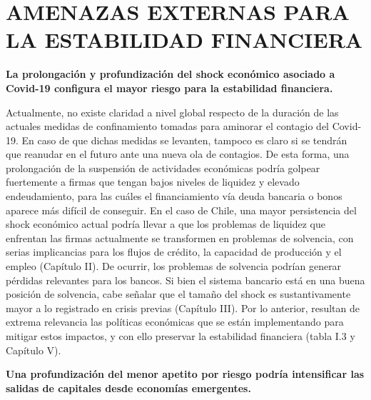 \documentclass[
]{book}
\begin{document}
\hypertarget{AEEF}{%
\section*{AMENAZAS EXTERNAS PARA LA ESTABILIDAD FINANCIERA}\label{AEEF}}

\textbf{La prolongación y profundización del shock económico asociado a Covid-19 configura el mayor riesgo para la estabilidad financiera.}

Actualmente, no existe claridad a nivel global respecto de la duración de las
actuales medidas de confinamiento tomadas para aminorar el contagio del
Covid-19. En caso de que dichas medidas se levanten, tampoco es claro si se
tendrán que reanudar en el futuro ante una nueva ola de contagios. De esta
forma, una prolongación de la suspensión de actividades económicas podría
golpear fuertemente a firmas que tengan bajos niveles de liquidez y elevado
endeudamiento, para las cuáles el financiamiento vía deuda bancaria o bonos
aparece más difícil de conseguir.
En el caso de Chile, una mayor persistencia del shock económico actual podría
llevar a que los problemas de liquidez que enfrentan las firmas actualmente se
transformen en problemas de solvencia, con serias implicancias para los flujos
de crédito, la capacidad de producción y el empleo (Capítulo II). De ocurrir, los
problemas de solvencia podrían generar pérdidas relevantes para los bancos. Si
bien el sistema bancario está en una buena posición de solvencia, cabe señalar
que el tamaño del shock es sustantivamente mayor a lo registrado en crisis
previas (Capítulo III). Por lo anterior, resultan de extrema relevancia las políticas
económicas que se están implementando para mitigar estos impactos, y con
ello preservar la estabilidad financiera (tabla I.3 y Capítulo V).

\textbf{Una profundización del menor apetito por riesgo podría intensificar las salidas de capitales desde economías emergentes.}
\end{document}
